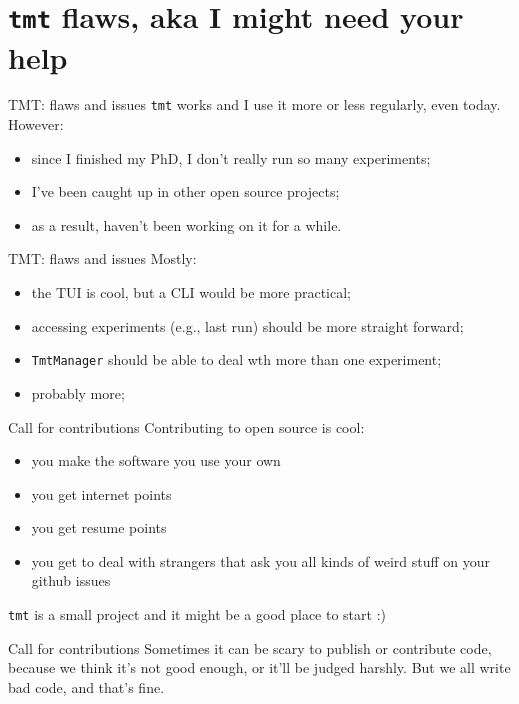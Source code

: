 \documentclass[aspectratio=169,xcolor={dvipsnames}]{beamer}
\begin{document}
  \section{\texttt{tmt} flaws, aka I might need your help}
  \begin{frame}{TMT: flaws and issues}
    \texttt{tmt} works and I use it more or less regularly, even today.
    However:
    \begin{itemize}
      \item since I finished my PhD, I don't really run so many experiments;
      \item I've been caught up in other open source projects;
      \item as a result, haven't been working on it for a while.
    \end{itemize}
  \end{frame}
  \begin{frame}{TMT: flaws and issues}
    Mostly:
    \begin{itemize}
      \item the TUI is cool, but a CLI would be more practical;
      \item accessing experiments (e.g., last run) should be more straight forward;
      \item \texttt{TmtManager} should be able to deal wth more than one experiment;
      \item probably more;
    \end{itemize}
  \end{frame}
  \begin{frame}{Call for contributions}
    Contributing to open source is cool:
    \begin{itemize}
      \item you make the software you use your own 
      \item you get internet points 
      \item you get resume points 
      \item \tiny{you get to deal with strangers that ask you all kinds of weird stuff on your github issues }
    \end{itemize}
    \texttt{tmt} is a small project and it might be a good place to start :)
  \end{frame}
  \begin{frame}{Call for contributions}
    Sometimes it can be scary to publish or contribute code, because we think it's not good enough, or it'll be
    judged harshly. But we all write bad code, and that's fine.
  \end{frame}
\end{document}
